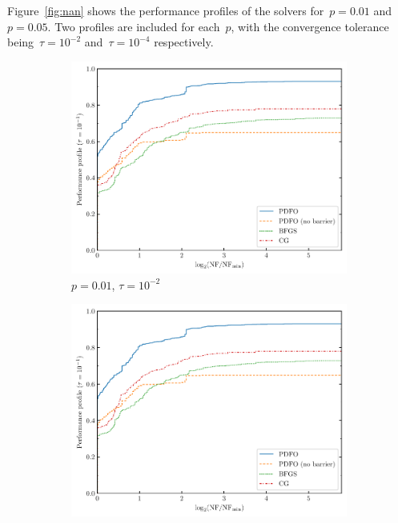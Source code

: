 \documentclass[
    smallextended,  %
    final,          %
]{svjour3}
\begin{document}
Figure~\ref{fig:nan} shows the performance profiles of the solvers for~$p = 0.01$ and~$p=0.05$.
Two profiles are included for each~$p$, with the convergence tolerance being~$\tau = 10^{-2}$ and~$\tau = 10^{-4}$ respectively.

\begin{figure}[htbp]
    \begin{subfigure}{.45\textwidth}
        \centering
        \includegraphics[width=\textwidth,page=2]{perf-nan-bfgs_cg_pdfo-50-10-0.01.pdf}
        \caption{$p = 0.01$, $\tau = 10^{-2}$}
    \end{subfigure}
    \hfill
    \begin{subfigure}{.45\textwidth}
        \centering
        \includegraphics[width=\textwidth,page=4]{perf-nan-bfgs_cg_pdfo-50-10-0.01.pdf}

\end{subfigure}
\end{figure}
\end{document}
